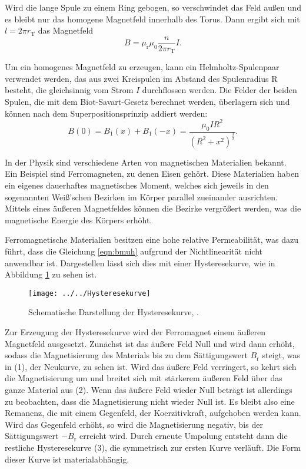 Wird die lange Spule zu einem Ring gebogen, so verschwindet das Feld außen und es bleibt nur das homogene Magnetfeld innerhalb des Torus. Dann ergibt sich mit
$l = 2\pi r_{\text{T}}$ das Magnetfeld
\begin{equation}
\label{eqn:formel2}
B = \mu_{\text{r}} \mu_0 \frac{n}{2\pi r_{\text{T}}} I.
\end{equation}

Um ein homogenes Magnetfeld zu erzeugen, kann ein Helmholtz-Spulenpaar verwendet werden, das aus zwei Kreispulen im Abstand des Spulenradius R besteht, die 
gleichsinnig vom Strom $I$ durchflossen werden. Die Felder der beiden Spulen, die mit dem Biot-Savart-Gesetz berechnet werden, überlagern sich und können nach dem 
Superpositionsprinzip addiert werden:
\begin{equation*}
B(0) = B_1(x) + B_1(-x) = \frac{\mu_0 I R^2}{(R^2 + x^2)^{\frac{3}{2}}}.
\end{equation*}

In der Physik sind verschiedene Arten von magnetischen Materialien bekannt. Ein Beispiel sind Ferromagneten, zu denen Eisen gehört. Diese Materialien haben ein
eigenes dauerhaftes magnetisches Moment, welches sich jeweils in den sogenannten Weiß'schen Bezirken im Körper parallel zueinander ausrichten. Mittels eines äußeren
Magnetfeldes können die Bezirke vergrößert werden, was die magnetische Energie des Körpers erhöht.

Ferromagnetische Materialien besitzen eine hohe relative Permeabilität, was dazu führt, dass die Gleichung \eqref{eqn:bmuh} aufgrund der Nichtlinearität nicht 
anwendbar ist. Dargestellen lässt sich dies mit einer Hysteresekurve, wie in Abbildung \ref{fig:hysteresekurve} zu sehen ist.
\begin{figure}[h!]
	\centering
	\texttt{[image: ../../Hysteresekurve]}
	\caption{Schematische Darstellung der Hysteresekurve, \cite[3]{anleitung308}.}
	\label{fig:hysteresekurve}
\end{figure}
Zur Erzeugung der Hysteresekurve wird der Ferromagnet einem äußeren Magnetfeld ausgesetzt. Zunächst ist das äußere Feld Null und wird dann erhöht, sodass die 
Magnetisierung des Materials bis zu dem Sättigungswert $B_{\text{r}}$ steigt, was in (1), der Neukurve, zu sehen ist. Wird das äußere Feld verringert, so kehrt sich die 
Magnetisierung um und breitet sich mit stärkerem äußeren Feld über das ganze Material aus (2). Wenn das äußere Feld wieder Null beträgt ist allerdings zu beobachten, 
dass die Magnetisierung nicht wieder Null ist. Es bleibt also eine Remanenz, die mit einem Gegenfeld, der Koerzitivkraft, aufgehoben werden kann. Wird das Gegenfeld 
erhöht, so wird die Magnetisierung negativ, bis der Sättigungswert $-B_{\text{r}}$ erreicht wird. Durch erneute Umpolung
entsteht dann die restliche Hysteresekurve (3), die symmetrisch zur ersten Kurve verläuft. Die Form dieser Kurve ist materialabhängig.

